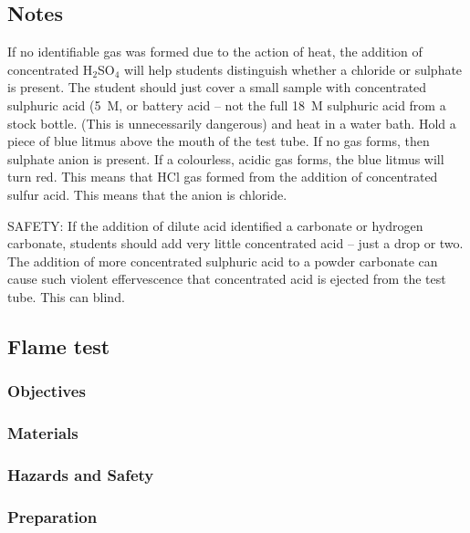 \subsection{Notes}

If no identifiable gas was formed due to the action of heat, 
the addition of concentrated H$_{2}$SO$_{4}$ will help students 
distinguish whether a chloride or sulphate is present. 
The student should just cover a small sample 
with concentrated sulphuric acid (5~M, 
or battery acid -- not the full 18~M sulphuric acid from a stock bottle. 
(This is unnecessarily dangerous) and heat in a water bath. 
Hold a piece of blue litmus above the mouth of the test tube. 
If no gas forms, 
then sulphate anion is present. 
If a colourless, 
acidic gas forms, 
the blue litmus will turn red. 
This means that HCl gas formed from the addition of concentrated sulfur acid. 
This means that the anion is chloride. 

SAFETY: If the addition of dilute acid identified 
a carbonate or hydrogen carbonate, 
students should add very little concentrated acid -- 
just a drop or two. 
The addition of more concentrated sulphuric acid 
to a powder carbonate can cause such violent effervescence 
that concentrated acid is ejected from the test tube. 
This can blind.


\subsection{Flame test}

\subsubsection{Objectives}


\subsubsection{Materials}


\subsubsection{Hazards and Safety}


\subsubsection{Preparation}
\begin{enumerate}
\end{enumerate}

